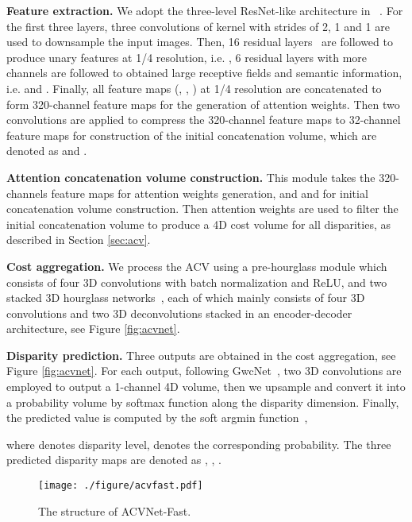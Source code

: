 \documentclass[10pt,twocolumn,letterpaper]{article}
\begin{document}
\textbf{Feature extraction.} We adopt the three-level ResNet-like architecture in ~\cite{guo2019group}. For the first three layers, three convolutions of  kernel with strides of 2, 1 and 1 are used to downsample the input images. Then, 16 residual layers~\cite{he2016deep} are followed to produce unary features at 1/4 resolution, i.e. , 6 residual layers with more channels are followed to obtained large receptive fields and semantic information, i.e.  and . Finally, all feature maps (, , ) at 1/4 resolution are concatenated to form 320-channel feature maps for the generation of attention weights. Then two convolutions are applied to compress the 320-channel feature maps to 32-channel feature maps for construction of the initial concatenation volume, which are denoted as  and .

\textbf{Attention concatenation volume construction.} This module takes the 320-channels feature maps for attention weights generation, and  and  for initial concatenation volume construction. Then attention weights are used to filter the initial concatenation volume to produce a 4D cost volume for all disparities, as described in Section \ref{sec:acv}.

\textbf{Cost aggregation.} We process the ACV using a pre-hourglass module which consists of four 3D convolutions with batch normalization and ReLU, and two stacked 3D hourglass networks~\cite{guo2019group}, each of which mainly consists of four 3D convolutions and two 3D deconvolutions stacked in an encoder-decoder architecture, see Figure \ref{fig:acvnet}. 


\textbf{Disparity prediction.} Three outputs are obtained in the cost aggregation, see Figure \ref{fig:acvnet}. For each output, following GwcNet~\cite{guo2019group}, two 3D convolutions are employed to output a 1-channel 4D volume, then we upsample and convert it into a probability volume by softmax function along the disparity dimension. Finally, the predicted value is computed by the soft argmin function~\cite{kendall2017end},

where  denotes disparity level,  denotes the corresponding probability. The three predicted disparity maps are denoted as , , .

\begin{figure}
\centering
{\texttt{[image: ./figure/acvfast.pdf]}}
\caption{
The structure of ACVNet-Fast.}\label{fig:acv_fast}
\vspace{-10pt}
\end{figure}
\end{document}
